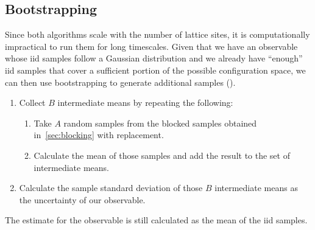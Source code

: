 	\subsection{Bootstrapping}\label{sec:bootstrap}
		Since both algorithms scale with the number of lattice sites, it is computationally impractical to run them for long timescales. Given that we have an observable whose iid samples follow a Gaussian distribution and we already have \enquote{enough} iid samples that cover a sufficient portion of the possible configuration space, we can then use bootstrapping to generate additional samples (\citet{bootstrap}).
		\begin{enumerate}
			\item Collect $B$ intermediate means by repeating the following:
			\begin{enumerate}
				\item Take $A$ random samples from the blocked samples obtained in~\cref{sec:blocking} with replacement.
				\item Calculate the mean of those samples and add the result to the set of intermediate means.
			\end{enumerate}
			\item Calculate the sample standard deviation of those $B$ intermediate means as the uncertainty of our observable.
		\end{enumerate}
		The estimate for the observable is still calculated as the mean of the iid samples.